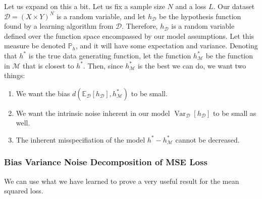 \documentclass{article}
\DeclareMathOperator{\Var}{Var}
\theoremstyle{definition}
\begin{document}
    Let us expand on this a bit. Let us fix a sample size $N$ and a loss $L$. Our dataset $\mathcal{D} = (X \times Y)^N$ is a random variable, and let $h_\mathcal{D}$ be the hypothesis function found by a learning algorithm from $\mathcal{D}$. Therefore, $h_{\mathcal{D}}$ is a random variable defined over the function space encompassed by our model assumptions. Let this measure be denoted $\mathbb{P}_h$, and it will have some expectation and variance. Denoting that $h^\ast$ is the true data generating function, let the function $h^\ast_\mathcal{M}$ be the function in $\mathcal{M}$ that is closest to $h^\ast$. Then, since $h_\mathcal{M}^\ast$ is the best we can do, we want two things: 
    \begin{enumerate}
        \item We want the bias $d(\mathbb{E}_\mathcal{D} [ h_\mathcal{D}], h^\ast_\mathcal{M})$ to be small. 
        \item We want the intrinsic noise inherent in our model $\Var_\mathcal{D} [h_\mathcal{D}]$ to be small as well. 
        \item The inherent misspecifiation of the model $h^\ast - h^\ast_{\mathcal{M}}$ cannot be decreased. 
    \end{enumerate}

    \subsubsection{Bias Variance Noise Decomposition of MSE Loss}

    We can use what we have learned to prove a very useful result for the mean squared loss. 
\end{document}
